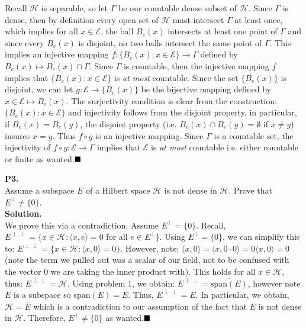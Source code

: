 \documentclass{article}
\begin{document}
    Recall $\mathcal{H}$ is separable, so let $\Gamma$ be our countable dense subset of $\mathcal{H}$. Since $\Gamma$ is dense,
    then by definition every open set of $\mathcal{H}$ must intersect $\Gamma$ at least once, which implies for all $x\in 
    \mathcal{E}$, the ball
    $B_e(x)$ intersects at least one point of $\Gamma$ and since every $B_e(x)$ is disjoint, no two balls intersect the
    same point of $\Gamma$. This implies an injective mapping $f: \{B_e(x): x\in \mathcal{E}\} \to \Gamma$ defined by $B_e(x)\mapsto 
    B_e(x)\cap \Gamma$. Since $\Gamma$ is countable, then the injective mapping $f$ implies that $\{B_e(x): x\in \mathcal{E}\}$ is 
    \textit{at most} countable. Since the set $\{B_e(x)\}$ is disjoint, we can let $g: \mathcal{E}\to \{B_e(x)\}$ be the bijective 
    mapping defined by $x\in\mathcal{E}\mapsto B_e(x)$. The surjectivity condition is clear from the construction: 
    $\{B_e(x): x\in\mathcal{E}\}$ and injectivity follows from the disjoint property, in particular, if $B_e(x) = B_e(y)$, the disjoint
    property (i.e. $B_e(x)\cap B_e(y)=\emptyset$ if $x\neq y$) insures $x=y$. Thus $f\circ g$ is an injective mapping. Since
    $\Gamma$ is a countable set, the injectivity of $f\circ g: \mathcal{E}\to \Gamma$ implies that $\mathcal{E}$ is \textit{at most}
    countable i.e. either countable or finite as wanted.$\hfill\blacksquare$

    \newpage

    \textbf{P3.}\\

    Assume a subspace $E$ of a Hilbert space $\mathcal{H}$ is not dense in $\mathcal{H}$. Prove that $E^{\perp}\neq\{0\}$.\\

    \textbf{Solution.}\\

    We prove this via a contradiction. Assume $E^{\perp} = \{0\}$. Recall, $E^{\perp\perp} = \{x\in\mathcal{H}: \langle x,e\rangle = 0$
    for all $e\in E^{\perp}\}$. Using $E^{\perp}=\{0\}$, we can simplify this to: $E^{\perp\perp}=\{x\in\mathcal{H}:\langle x,0\rangle
    = 0\}$. However, note: $\langle x,0\rangle = \langle x,0\cdot 0\rangle = 0\langle x,0\rangle = 0$ (note the term we pulled out
    was a scalar of our field, not to be confused with the vector 0 we are taking the inner product with). This holds for all $x\in
    \mathcal{H}$, thus: $E^{\perp\perp} = \mathcal{H}$. Using problem 1, we obtain: $E^{\perp\perp} = \overline{\text{span}(E)}$,
    however note $E$ is a subspace so span$(E) = E$. Thus, $E^{\perp\perp} = \overline{E}$. In particular, we obtain,
    $\mathcal{H} = \overline{E}$ which is a contradiction to our assumption of the fact that $E$ is not dense in $\mathcal{H}$.
    Therefore, $E^{\perp}\neq\{0\}$ as wanted.$\hfill\blacksquare$\\
\end{document}
